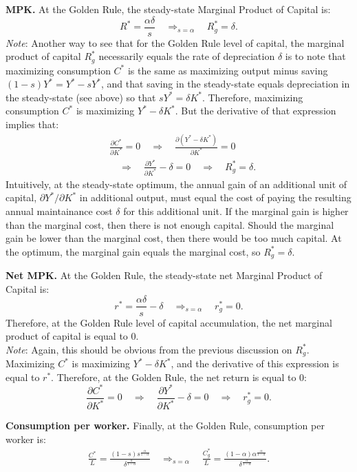 \documentclass[]{book}
\begin{document}
\textbf{MPK.} At the Golden Rule, the steady-state Marginal Product of
Capital is: \[
R^{*}=\frac{\alpha \delta}{s} \quad \Rightarrow_{s=\alpha} \quad \boxed{R^*_g = \delta}.
\] \emph{Note}: Another way to see that for the Golden Rule level of
capital, the marginal product of capital \(R^{*}_g\) necessarily equals
the rate of depreciation \(\delta\) is to note that maximizing
consumption \(C^{*}\) is the same as maximizing output minus saving
\((1-s)Y^{*} = Y^{*} - s Y^{*}\), and that saving in the steady-state
equals depreciation in the steady-state (see above) so that
\(s Y^{*}=\delta K^{*}\). Therefore, maximizing consumption \(C^{*}\) is
maximizing \(Y^{*}-\delta K^{*}.\) But the derivative of that expression
implies that: \[
\begin{aligned}
&\frac{\partial C^{*}}{\partial K^{*}}=0 \quad \Rightarrow \quad \frac{\partial (Y^{*}-\delta K^{*})}{\partial K^{*}}=0\\
& \quad \Rightarrow \quad \frac{\partial Y^{*}}{\partial K^{*}}-\delta=0 \quad \Rightarrow \quad R^{*}_g=\delta.
\end{aligned}
\] Intuitively, at the steady-state optimum, the annual gain of an
additional unit of capital, \(\partial Y^{*}/ \partial K^{*}\) in
additional output, must equal the cost of paying the resulting annual
maintainance cost \(\delta\) for this additional unit. If the marginal
gain is higher than the marginal cost, then there is not enough capital.
Should the marginal gain be lower than the marginal cost, then there
would be too much capital. At the optimum, the marginal gain equals the
marginal cost, so \(R^{*}_g=\delta.\)

\textbf{Net MPK.} At the Golden Rule, the steady-state net Marginal
Product of Capital is: \[
r^{*}=\frac{\alpha \delta}{s}-\delta \quad \Rightarrow_{s=\alpha} \quad \boxed{r^*_g = 0}.
\] Therefore, at the Golden Rule level of capital accumulation, the net
marginal product of capital is equal to 0.\\
\emph{Note}: Again, this should be obvious from the previous discussion
on \(R^{*}_g\). Maximizing \(C^{*}\) is maximizing
\(Y^{*}-\delta K^{*}\), and the derivative of this expression is equal
to \(r^{*}\). Therefore, at the Golden Rule, the net return is equal to
\(0\):
\[\frac{\partial C^{*}}{\partial K^{*}}=0 \quad \Rightarrow \quad \frac{\partial Y^{*}}{\partial K^{*}}-\delta=0 \quad \Rightarrow \quad r^{*}_g=0.\]

\textbf{Consumption per worker.} Finally, at the Golden Rule,
consumption per worker is: \[
\begin{aligned}
\frac{C^{*}}{L}=\frac{(1-s)s^{\frac{\alpha}{1-\alpha}}}{\delta^{\frac{\alpha}{1-\alpha}}} \quad \Rightarrow_{s=\alpha} \quad \boxed{\frac{C^{*}_g}{L}=\frac{(1-\alpha)\alpha^{\frac{\alpha}{1-\alpha}}}{\delta^{\frac{\alpha}{1-\alpha}}}}.
\end{aligned}
\]
\end{document}
